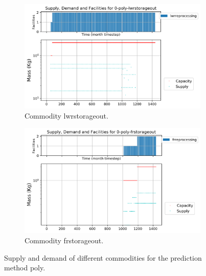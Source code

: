 \documentclass[11pt]{article}
\begin{document}
\begin{figure}[]
	\centering
	\begin{subfigure}[t]{0.45\textwidth}
		\centering
		\includegraphics[width=\linewidth]{23-figures/0-poly-lwrstorageout.png} 
		\caption{Commodity lwrstorageout.}
		\label{fig:23-lwrstorageout}
	\end{subfigure}
	\vspace{1cm}
	\begin{subfigure}[t]{0.45\textwidth}
		\centering
		\includegraphics[width=\linewidth]{23-figures/0-poly-frstorageout.png} 
		\caption{Commodity frstorageout.}
		\label{fig:23-frstorageout}
	\end{subfigure}
	\hfill
	\caption{Supply and demand of different commodities for the prediction method poly.}
	\label{fig:23-storageout}
\end{figure}
\end{document}
